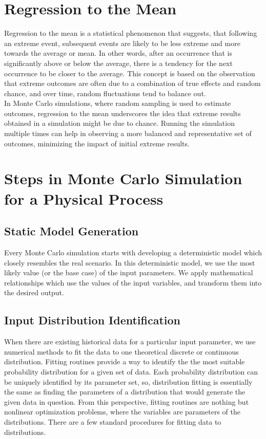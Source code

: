 \documentclass[12pt]{article}
\begin{document}
    \section{Regression to the Mean}
    Regression to the mean is a statistical phenomenon that suggests, that following an extreme event, subsequent events are likely to be less extreme and more towards the average or mean. In other words, after an occurrence that is significantly above or below the average, there is a tendency for the next occurrence to be closer to the average. This concept is based on the observation that extreme outcomes are often due to a combination of true effects and random chance, and over time, random fluctuations tend to balance out.\\
    In Monte Carlo simulations, where random sampling is used to estimate outcomes, regression to the mean underscores the idea that extreme results obtained in a simulation might be due to chance. Running the simulation multiple times can help in observing a more balanced and representative set of outcomes, minimizing the impact of initial extreme results.

    \section{Steps in Monte Carlo Simulation for a Physical Process}
    \subsection{Static Model Generation}
    Every Monte Carlo simulation starts with developing a deterministic model which closely resembles the real scenario. In this deterministic
    model, we use the most likely value (or the base case) of
    the input parameters. We apply mathematical relationships
    which use the values of the input variables, and transform
    them into the desired output.
    \subsection{Input Distribution Identiﬁcation}
    When there are existing historical data
for a particular input parameter, we use numerical methods
to fit the data to one theoretical discrete or continuous
distribution. Fitting routines provide a way to identify the
the most suitable probability distribution for a given set of data.
Each probability distribution can be uniquely identified by its
parameter set, so, distribution fitting is essentially the same
as finding the parameters of a distribution that would generate
the given data in question. From this perspective, fitting
routines are nothing but nonlinear optimization problems, where the variables are parameters of the distributions. There
are a few standard procedures for fitting data to distributions.
\end{document}
